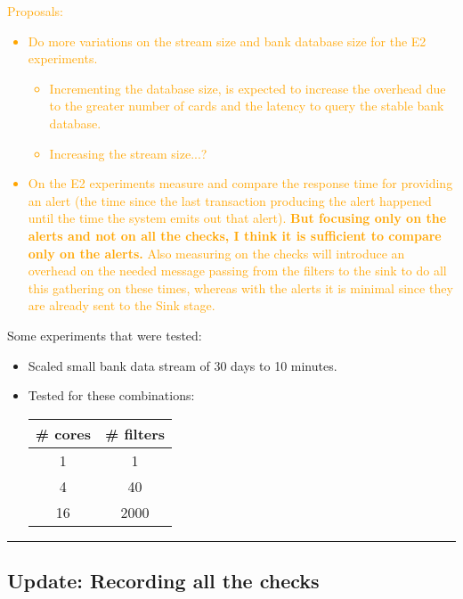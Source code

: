\textcolor{orange}{
Proposals:
\begin{itemize}
    \item Do more variations on the stream size and bank database size for the E2 experiments.
    \begin{itemize}
        \item Incrementing the database size, is expected to increase the overhead due to the greater number of cards and the latency to query the stable bank database.
        \item Increasing the stream size...?
    \end{itemize}
    \item On the E2 experiments measure and compare the response time for providing an alert (the time since the last transaction producing the alert happened until the time the system emits out that alert). \textbf{But focusing only on the alerts and not on all the checks, I think it is sufficient to compare only on the alerts.} Also measuring on the checks will introduce an overhead on the needed message passing from the filters to the sink to do all this gathering on these times, whereas with the alerts it is minimal since they are already sent to the Sink stage.
\end{itemize}
}

Some experiments that were tested:

\begin{itemize}
    \item Scaled small bank data stream of 30 days to 10 minutes.
    \item Tested for these combinations:
    \begin{table}[H]
      \renewcommand{\arraystretch}{1.5} %
      \centering
      \begin{tabular}{|c|c|}
      \hline
      \# cores & \# filters \\ \hline
      1        & 1  \\ \hline
      4        & 40  \\ \hline
      16       & 2000  \\ \hline
      \end{tabular}
    \end{table}
\end{itemize}

\rule{\textwidth}{0.4pt} 

\subsection{Update: Recording all the checks}


